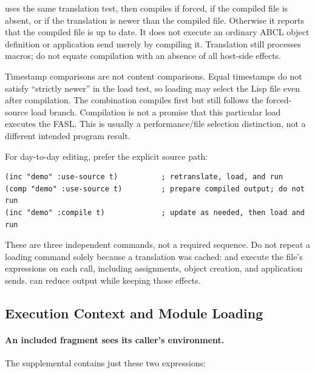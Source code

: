  uses the same translation test, then compiles if forced,
if the compiled file is absent, or if the translation is newer than
the compiled file. Otherwise it reports that the compiled file is up
to date. It does not execute an ordinary ABCL object definition or
application send merely by compiling it. Translation still processes
macros; do not equate compilation with an absence of all host-side effects.

Timestamp comparisons are not content comparisons. Equal timestamps
do not satisfy ``strictly newer'' in the load test, so loading may select
the Lisp file even after compilation. The combination
 compiles first but still follows the
forced-source load branch. Compilation is not a promise that this
particular load executes the FASL. This is usually a performance/file
selection distinction, not a different intended program result.

For day-to-day editing, prefer the explicit source path:

\begin{codeblock}
\begin{lstlisting}
(inc "demo" :use-source t)          ; retranslate, load, and run
(comp "demo" :use-source t)         ; prepare compiled output; do not run
(inc "demo" :compile t)             ; update as needed, then load and run
\end{lstlisting}
\end{codeblock}

These are three independent commands, not a required sequence. Do not
repeat a loading command solely because a translation was cached:
 and  execute the file's expressions on each call,
including assignments, object creation, and application sends.
 can reduce output while keeping those effects.

\subsection{Execution Context and Module Loading}

\paragraph{An included fragment sees its caller's environment.}
The supplemental 
contains just these two expressions:


